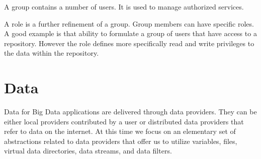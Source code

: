 \documentclass[9pt,twocolumn]{styles/osajnl}
\begin{document}
A group contains a number of users. It is used to manage authorized
services.



A role is a further refinement of a group. Group members can have
specific roles. A good example is that ability to formulate a group of
users that have access to a repository. However the role defines more
specifically read and write privileges to the data within the repository.


\section{Data}

Data for Big Data applications are delivered through data
providers. They can be either local providers contributed by a user or
distributed data providers that refer to data on the internet. At this
time we focus on an elementary set of abstractions related to data
providers that offer us to utilize variables, files, virtual data
directories, data streams, and data filters.
\end{document}
